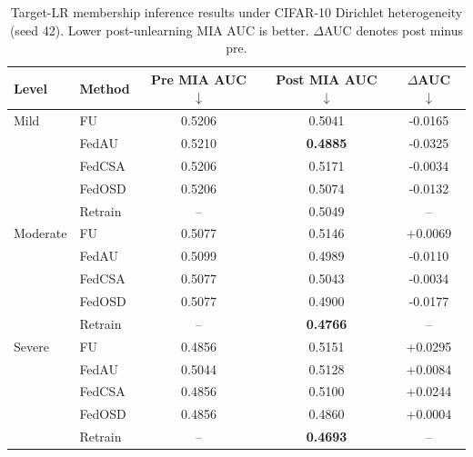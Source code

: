 \begin{table}[t]
\centering
\caption{Target-LR membership inference results under CIFAR-10 Dirichlet heterogeneity (seed 42). Lower post-unlearning MIA AUC is better. $\Delta$AUC denotes post minus pre.}
\label{tab:targetlr_mia_seed42}
\begin{tabular}{llccc}
\toprule
Level & Method & Pre MIA AUC $\downarrow$ & Post MIA AUC $\downarrow$ & $\Delta$AUC $\downarrow$ \\
\midrule
Mild & FU & 0.5206 & 0.5041 & -0.0165 \\
 & FedAU & 0.5210 & \textbf{0.4885} & -0.0325 \\
 & FedCSA & 0.5206 & 0.5171 & -0.0034 \\
 & FedOSD & 0.5206 & 0.5074 & -0.0132 \\
 & Retrain & -- & 0.5049 & -- \\
\midrule
Moderate & FU & 0.5077 & 0.5146 & +0.0069 \\
 & FedAU & 0.5099 & 0.4989 & -0.0110 \\
 & FedCSA & 0.5077 & 0.5043 & -0.0034 \\
 & FedOSD & 0.5077 & 0.4900 & -0.0177 \\
 & Retrain & -- & \textbf{0.4766} & -- \\
\midrule
Severe & FU & 0.4856 & 0.5151 & +0.0295 \\
 & FedAU & 0.5044 & 0.5128 & +0.0084 \\
 & FedCSA & 0.4856 & 0.5100 & +0.0244 \\
 & FedOSD & 0.4856 & 0.4860 & +0.0004 \\
 & Retrain & -- & \textbf{0.4693} & -- \\
\bottomrule
\end{tabular}
\end{table}